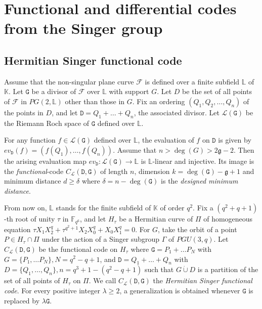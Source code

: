 \documentclass[9pt]{article}
\theoremstyle{plain}
\begin{document}




\section{Functional and differential codes from the Singer group} 
\subsection{Hermitian Singer functional code}\label{sec3.1} Assume that the non-singular plane curve $\mathcal{F}$ is defined over a finite subfield $\mathbb{L}$ of $\mathbb{K}$. Let $\mathtt{G}$ be a divisor of $\mathcal{F}$ over $\mathbb{L}$ with support $G$. Let $D$ be the set of all points of $\mathcal{F}$ in $PG(2,\mathbb{L})$ other than those in $G$. Fix an ordering $(Q_1,Q_2,\ldots,Q_n)$ of the points in $D$, and let $\mathtt{D}=Q_1+\ldots+Q_n$, the associated divisor. 
Let $\mathcal{L}(\mathtt{G})$ be the Riemann Roch space of $\mathtt{G}$ defined over $\mathbb{L}$. 

For any function $f\in\mathcal L(\mathtt G)$ defined over $\mathbb{L}$, the evaluation of $f$ on $\mathtt{D}$ is given by $ev_{\mathtt D}(f) =(f(Q_1),\ldots, f(Q_n))$. Assume that $n>\deg(G)>2\mathfrak{g}-2$. Then the arising evaluation map $ev_{\mathtt D}:\mathcal L(\mathtt G)\rightarrow\mathbb{L}$ is $\mathbb{L}$-linear and injective. Its image is the {\emph{functional}}-code $C_{\mathcal{L}}(\mathtt{D},\mathtt{G})$ of length $n$, dimension $k=\deg(\mathtt{G})-\mathfrak{g}+1$ and minimum distance $d\geq \delta$ where $\delta=n-\deg(\mathtt{G})$ is the \emph{designed minimum distance}. 
 



From now on, $\mathbb{L}$ stands for the finite subfield of $\mathbb{K}$ of order $q^2$. Fix a $(q^2+q+1)$-th root of unity $\tau$ in $\mathbb{F}_{q^6}$, and let $H_\tau$ be a Hermitian curve of $\Pi$ of homogeneous equation $\tau X_1X_2^q+\tau^{q^2+1}X_2X_0^q+X_0X_1^q=0$. For $G$, take the orbit of a point $P\in H_\tau\cap \Pi$ under the action of a Singer subgroup $\Gamma$ of $PGU(3,q)$. Let $C_{\mathcal{L}}(\mathtt D,\mathtt G)$ be the functional code on $H_\tau$ where $\mathtt{G}=P_1+\ldots P_N$ with $G=\{P_1,\ldots P_N\}, N=q^2-q+1$, and $\mathtt{D}=Q_1+\ldots+Q_n$ with $D=\{Q_1,\ldots,Q_n\},n=q^3+1-(q^2-q+1)$ such that $G\dot\cup D$ is a partition of the set of all points of $H_\tau$ on $\Pi$.  
We call $C_\mathcal{L}(\mathtt{D},\mathtt{G})$ the \emph{Hermitian Singer functional code}. For every positive integer $\lambda\ge 2$, a generalization is obtained whenever $\mathtt{G}$ is replaced by $\lambda\mathtt{G}$. 
\end{document}
